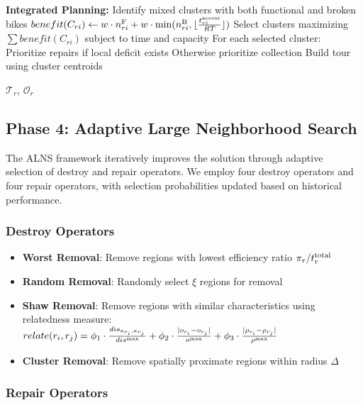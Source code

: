 \begin{algorithm}[htbp]
\begin{algorithmic}[1]
        \Else {}
        \State \textbf{Integrated Planning:}
        \State Identify mixed clusters with both functional and broken bikes
        \State $benefit(C_{ri}) \leftarrow w \cdot n_{ri}^{\text{F}} + w \cdot \min(n_{ri}^{\text{B}}, \lfloor \frac{t_{ri}^{\text{access}}}{RT} \rfloor)$
        \State Select clusters maximizing $\sum benefit(C_{ri})$ subject to time and capacity
        \State For each selected cluster:
        \State \quad Prioritize repairs if local deficit exists
        \State \quad Otherwise prioritize collection
        \State Build tour using cluster centroids
        \EndIf

        \State \Return $\mathcal{T}_r$, $\mathcal{O}_r$
    \end{algorithmic}
\end{algorithm}

\subsection{Phase 4: Adaptive Large Neighborhood Search}

The ALNS framework iteratively improves the solution through adaptive selection of destroy and repair operators. We employ four destroy operators and four repair operators, with selection probabilities updated based on historical performance.

\subsubsection{Destroy Operators}

\begin{itemize}
    \item \textbf{Worst Removal}: Remove regions with lowest efficiency ratio $\pi_r / t^{\text{total}}_r$
    \item \textbf{Random Removal}: Randomly select $\xi$ regions for removal
    \item \textbf{Shaw Removal}: Remove regions with similar characteristics using relatedness measure:
          $relate(r_i, r_j) = \phi_1 \cdot \frac{dis_{\kappa_{r_i}, \kappa_{r_j}}}{dis^{\text{max}}} + \phi_2 \cdot \frac{|o_{r_i} - o_{r_j}|}{o^{\text{max}}} + \phi_3 \cdot \frac{|\rho_{r_i} - \rho_{r_j}|}{\rho^{\text{max}}}$
    \item \textbf{Cluster Removal}: Remove spatially proximate regions within radius $\Delta$
\end{itemize}

\subsubsection{Repair Operators}

